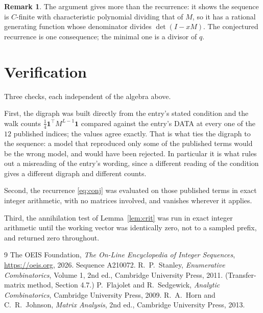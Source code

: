 \documentclass[11pt,a4paper]{article}
\theoremstyle{plain}
\theoremstyle{definition}
\newtheorem{remark}[theorem]{Remark}
\begin{document}
\begin{remark}
The argument gives more than the recurrence: it shows the sequence is $C$-finite with
characteristic polynomial dividing that of $M$, so it has a rational generating function
whose denominator divides $\det(I-xM)$. The conjectured recurrence is one consequence; the
minimal one is a divisor of $q$.
\end{remark}

\section{Verification}

Three checks, each independent of the algebra above.

First, the digraph was built directly from the entry's stated condition and the walk counts
$\tfrac1{4}\mathbf{1}^{\!\top}M^{L-1}\mathbf{1}$ compared against the entry's DATA at
every one of the $12$ published indices; the values agree exactly. That is what ties
the digraph to the sequence: a model that reproduced only some of the published terms would
be the wrong model, and would have been rejected. In particular it is what rules out a
misreading of the entry's wording, since a different reading of the condition gives a
different digraph and different counts.

Second, the recurrence \eqref{eq:conj} was evaluated on those published terms in exact
integer arithmetic, with no matrices involved, and vanishes wherever it applies.

Third, the annihilation test of Lemma~\ref{lem:crit} was run in exact integer arithmetic
until the working vector was identically zero, not to a sampled prefix, and returned zero
throughout.

\begin{thebibliography}{9}
 The OEIS Foundation, \emph{The On-Line Encyclopedia of Integer
Sequences}, \url{https://oeis.org}, 2026. Sequence A210072.
 R.~P.~Stanley, \emph{Enumerative Combinatorics}, Volume 1, 2nd ed.,
Cambridge University Press, 2011. (Transfer-matrix method, Section 4.7.)
 P.~Flajolet and R.~Sedgewick, \emph{Analytic Combinatorics}, Cambridge
University Press, 2009.
 R.~A.~Horn and C.~R.~Johnson, \emph{Matrix Analysis}, 2nd ed., Cambridge
University Press, 2013.
\end{thebibliography}
\end{document}
